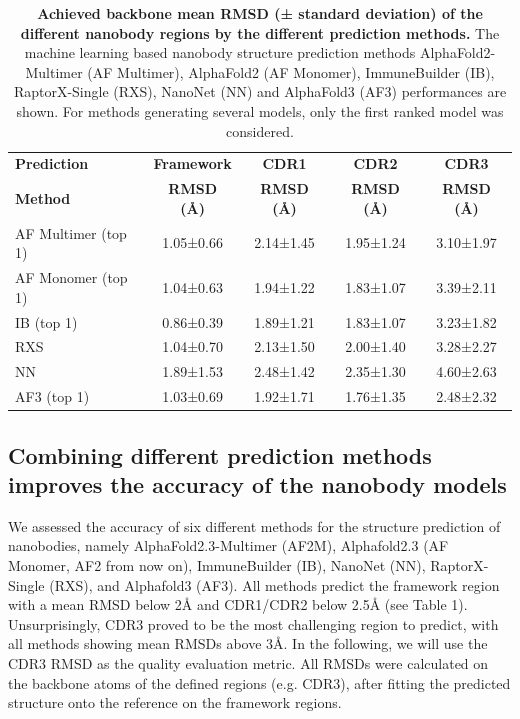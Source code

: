 \documentclass[12pt]{article}
\begin{document}
\begin{table}
\centering
{\small
\begin{tabular}{@{}lcccc@{}}
\toprule
\textbf{Prediction} & \textbf{Framework} & \textbf{CDR1} & \textbf{CDR2} & \textbf{CDR3} \\
\textbf{Method} & \textbf{RMSD (Å)} & \textbf{RMSD (Å)} & \textbf{RMSD (Å)} & \textbf{RMSD (Å)} \\ \midrule
AF Multimer (top 1) & 1.05±0.66 & 2.14±1.45 & 1.95±1.24 & 3.10±1.97 \\
AF Monomer (top 1)  & 1.04±0.63 & 1.94±1.22 & 1.83±1.07 & 3.39±2.11 \\
IB (top 1)          & 0.86±0.39 & 1.89±1.21 & 1.83±1.07 & 3.23±1.82 \\
RXS                 & 1.04±0.70 & 2.13±1.50 & 2.00±1.40 & 3.28±2.27 \\
NN                  & 1.89±1.53 & 2.48±1.42 & 2.35±1.30 & 4.60±2.63 \\
AF3 (top 1)         & 1.03±0.69 & 1.92±1.71 & 1.76±1.35 & 2.48±2.32 \\ \bottomrule
\end{tabular}
}
\caption{\textbf{Achieved backbone mean RMSD (± standard deviation) of the different nanobody regions by the different prediction methods.} The machine learning based nanobody structure prediction methods AlphaFold2-Multimer (AF Multimer), AlphaFold2 (AF Monomer), ImmuneBuilder (IB), RaptorX-Single (RXS), NanoNet (NN) and AlphaFold3 (AF3) performances are shown. For methods generating several models, only the first ranked model was considered.}
\label{tab:new_rmsd}
\end{table}



\subsection{Combining different prediction methods improves the accuracy of the nanobody models}

We assessed the accuracy of six different methods for the structure prediction of nanobodies, namely AlphaFold2.3-Multimer (AF2M), Alphafold2.3 (AF Monomer, AF2 from now on), ImmuneBuilder (IB), NanoNet (NN), RaptorX-Single (RXS), and Alphafold3 (AF3). All methods predict the framework region with a mean RMSD below 2Å and CDR1/CDR2 below 2.5Å (see Table 1). Unsurprisingly, CDR3 proved to be the most challenging region to predict, with all methods showing mean RMSDs above 3Å. In the following, we will use the CDR3 RMSD as the quality evaluation metric. All RMSDs were calculated on the backbone atoms of the defined regions (e.g. CDR3), after fitting the predicted structure onto the reference on the framework regions.
\end{document}
